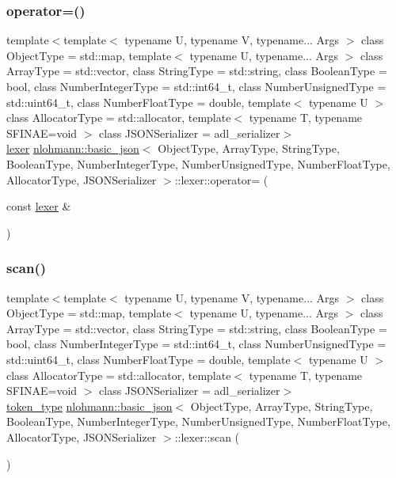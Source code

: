 \subsubsection{\texorpdfstring{operator=()}{operator=()}}
{\footnotesize\ttfamily template$<$template$<$ typename U, typename V, typename... Args $>$ class Object\+Type = std\+::map, template$<$ typename U, typename... Args $>$ class Array\+Type = std\+::vector, class String\+Type  = std\+::string, class Boolean\+Type  = bool, class Number\+Integer\+Type  = std\+::int64\+\_\+t, class Number\+Unsigned\+Type  = std\+::uint64\+\_\+t, class Number\+Float\+Type  = double, template$<$ typename U $>$ class Allocator\+Type = std\+::allocator, template$<$ typename T, typename S\+F\+I\+N\+A\+E=void $>$ class J\+S\+O\+N\+Serializer = adl\+\_\+serializer$>$ \\
\hyperlink{classnlohmann_1_1basic__json_1_1lexer}{lexer} \hyperlink{classnlohmann_1_1basic__json}{nlohmann\+::basic\+\_\+json}$<$ Object\+Type, Array\+Type, String\+Type, Boolean\+Type, Number\+Integer\+Type, Number\+Unsigned\+Type, Number\+Float\+Type, Allocator\+Type, J\+S\+O\+N\+Serializer $>$\+::lexer\+::operator= (\begin{DoxyParamCaption}\item[{const \hyperlink{classnlohmann_1_1basic__json_1_1lexer}{lexer} \&}]{ }\end{DoxyParamCaption})\hspace{0.3cm}{\ttfamily [delete]}}

\mbox{\label{classnlohmann_1_1basic__json_1_1lexer_aa2bf285bc6ee37e2af87dfd627224b41}} 
\subsubsection{\texorpdfstring{scan()}{scan()}}
{\footnotesize\ttfamily template$<$template$<$ typename U, typename V, typename... Args $>$ class Object\+Type = std\+::map, template$<$ typename U, typename... Args $>$ class Array\+Type = std\+::vector, class String\+Type  = std\+::string, class Boolean\+Type  = bool, class Number\+Integer\+Type  = std\+::int64\+\_\+t, class Number\+Unsigned\+Type  = std\+::uint64\+\_\+t, class Number\+Float\+Type  = double, template$<$ typename U $>$ class Allocator\+Type = std\+::allocator, template$<$ typename T, typename S\+F\+I\+N\+A\+E=void $>$ class J\+S\+O\+N\+Serializer = adl\+\_\+serializer$>$ \\
\hyperlink{classnlohmann_1_1basic__json_1_1lexer_a96887d6cd131e3d3a85a9d71fbdbcdf7}{token\+\_\+type} \hyperlink{classnlohmann_1_1basic__json}{nlohmann\+::basic\+\_\+json}$<$ Object\+Type, Array\+Type, String\+Type, Boolean\+Type, Number\+Integer\+Type, Number\+Unsigned\+Type, Number\+Float\+Type, Allocator\+Type, J\+S\+O\+N\+Serializer $>$\+::lexer\+::scan (\begin{DoxyParamCaption}{ }\end{DoxyParamCaption})\hspace{0.3cm}{\ttfamily [inline]}}


